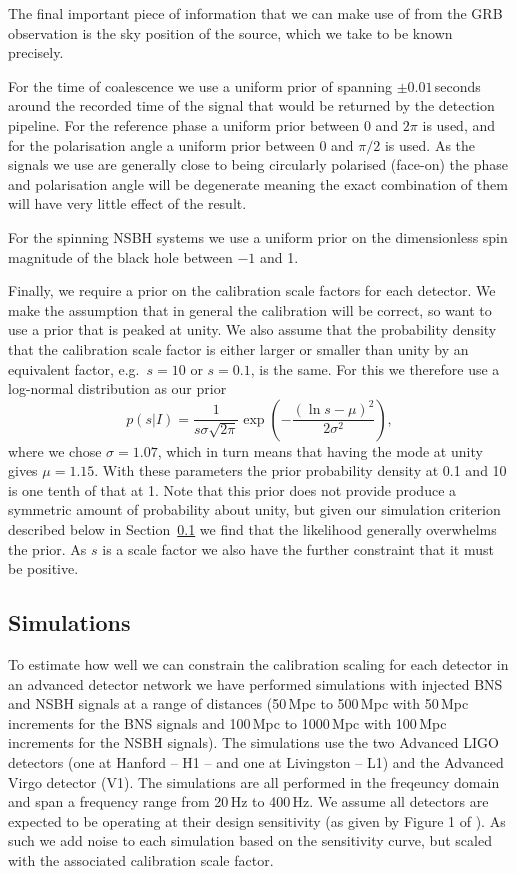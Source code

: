 \documentclass[10pt]{iopart}
\begin{document}
The final important piece of information that we can make use of from the GRB observation is the 
sky position of the source, which we take to be known precisely.

For the time of coalescence we use a uniform prior of spanning $\pm0.01$\,seconds around the 
recorded time of the signal that would be returned by the detection pipeline. For the reference 
phase a uniform prior between 0 and $2\pi$ is used, and for the polarisation angle a uniform prior 
between 0 and $\pi/2$ is used. As the signals we use are generally close to being circularly 
polarised (face-on) the phase and polarisation angle will be degenerate meaning the exact 
combination of them will have very little effect of the result.

For the spinning \ac{NSBH} systems we use a uniform prior on the dimensionless spin magnitude of 
the black hole between $-1$ and 1.

Finally, we require a prior on the calibration scale factors for each detector. We make the 
assumption that in general the calibration will be correct, so want to use a prior that is peaked 
at unity. We also assume that the probability density that the calibration scale factor is either 
larger or smaller than unity by an equivalent factor, e.g.\ $s=10$ or $s=0.1$, is the same. For this 
we therefore use a log-normal distribution as our prior
\begin{equation}
 p(s|I) = \frac{1}{s\sigma\sqrt{2\pi}}\exp{\left( -\frac{(\ln{s} - \mu)^2}{2\sigma^2} \right)},
\end{equation}
where we chose $\sigma = 1.07$, which in turn means that having the mode at unity gives $\mu = 
1.15$. With these parameters the prior probability density at 0.1 and 10 is one tenth of that at 
1. Note that this prior does not provide produce a symmetric amount of probability about unity, but 
given our simulation criterion described below in Section~\ref{sec:simulations} we find that the 
likelihood generally overwhelms the prior. As $s$ is a scale factor we also have the further 
constraint that it must be positive.

\subsection{Simulations}\label{sec:simulations}

To estimate how well we can constrain the calibration scaling for each detector in an advanced 
detector network we have performed simulations with injected \ac{BNS} and \ac{NSBH} signals at a 
range of distances (50\,Mpc to 500\,Mpc with 50\,Mpc increments for the \ac{BNS} signals and 
100\,Mpc to 1000\,Mpc with 100\,Mpc increments for the \ac{NSBH} signals). The simulations use the 
two Advanced LIGO detectors (one at Hanford -- H1 -- and one at Livingston -- L1) and the Advanced 
Virgo detector (V1). The simulations are all performed in the freqeuncy domain and span a frequency 
range from 20\,Hz to 400\,Hz. We assume all detectors are expected to be operating at their design
sensitivity (as given by Figure 1 of \cite{2013arXiv1304.0670L}). As such we add noise to each 
simulation based on the sensitivity curve, but scaled with the associated calibration scale factor.
\end{document}

